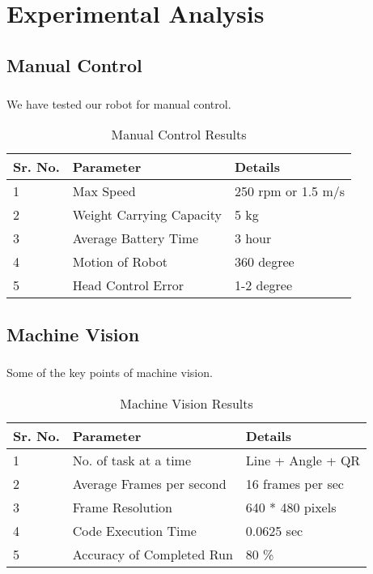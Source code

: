 \chapter{Experimental Analysis}
\section{Manual Control}
\paragraph{} We have tested our robot for manual control.


\begin{table}[htbp]
\caption{Manual Control Results}
\begin{center}
\begin{tabular}{|p{1.5cm}|p{6cm}|p{4cm}|}
\hline \textbf{Sr. No.} & \textbf{Parameter} & \textbf{Details}\\
\hline 1 & Max Speed & 250 rpm or 1.5 m/s\\
\hline 2 & Weight Carrying Capacity & 5 kg\\
\hline 3 & Average Battery Time & 3 hour \\
\hline 4 & Motion of Robot & 360 degree\\
\hline 5 & Head Control Error & 1-2 degree\\
\hline
\end{tabular}
\end{center}
\end{table}

\section{Machine Vision}
\paragraph{} Some of the key points of machine vision.

\begin{table}[htbp]
\caption{Machine Vision Results}
\begin{center}
\begin{tabular}{|p{1.5cm}|p{6cm}|p{4cm}|}
\hline \textbf{Sr. No.} & \textbf{Parameter} & \textbf{Details}\\
\hline 1 & No. of task at a time & Line + Angle + QR \\
\hline 2 & Average Frames per second & 16 frames per sec\\
\hline 3 & Frame Resolution & 640 * 480 pixels\\
\hline 4 & Code Execution Time &  0.0625 sec\\
\hline 5 & Accuracy of Completed Run & 80 \%\\
\hline
\end{tabular}
\end{center}
\end{table}

